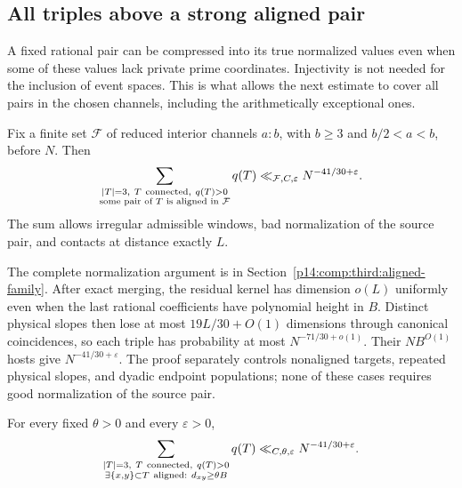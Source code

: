 \subsection{All triples above a strong aligned pair}

A fixed rational pair can be compressed into its true normalized values
even when some of these values lack private prime coordinates.
Injectivity is not needed for the inclusion of event spaces.  This is
what allows the next estimate to cover all pairs in the chosen channels,
including the arithmetically exceptional ones.

\begin{proposition}
\label{p13:third:aligned-family}
Fix a finite set $\mathcal F$ of reduced interior channels $a:b$, with
$b\geq3$ and $b/2<a<b$, before $N$.  Then
\begin{equation}
 \sum_{\substack{|T|=3,\ T\ {\rm connected},\ q(T)>0\\
            \text{some pair of }T\text{ is aligned in }\mathcal F}}q(T)
       \ll_{\mathcal F,C,\varepsilon}N^{-41/30+\varepsilon}.
 \label{p13:third:aligned-family-bound}
\end{equation}
The sum allows irregular admissible windows, bad normalization of the
source pair, and contacts at distance exactly $L$.
\end{proposition}

The complete normalization argument is in
Section~\ref{p14:comp:third:aligned-family}.  After exact merging, the
residual kernel has dimension $o(L)$ uniformly even when the last
rational coefficients have polynomial height in $B$.  Distinct
physical slopes then lose at most $19L/30+O(1)$ dimensions through
canonical coincidences, so each triple has probability at most
$N^{-71/30+o(1)}$.  Their $NB^{O(1)}$ hosts give
$N^{-41/30+\varepsilon}$.  The proof separately controls nonaligned
targets, repeated physical slopes, and dyadic endpoint populations;
none of these cases requires good normalization of the source pair.

\begin{corollary}
\label{p13:third:aligned}
For every fixed $\theta>0$ and every $\varepsilon>0$,
\begin{equation}
 \sum_{\substack{|T|=3,\ T\ {\rm connected},\ q(T)>0\\
        \exists\{x,y\}\subset T\ {\rm aligned}:\ d_{xy}\geq\theta B}}
             q(T)\ll_{C,\theta,\varepsilon}N^{-41/30+\varepsilon}.
 \label{p13:third:strong-aligned-bound}
\end{equation}
\end{corollary}

